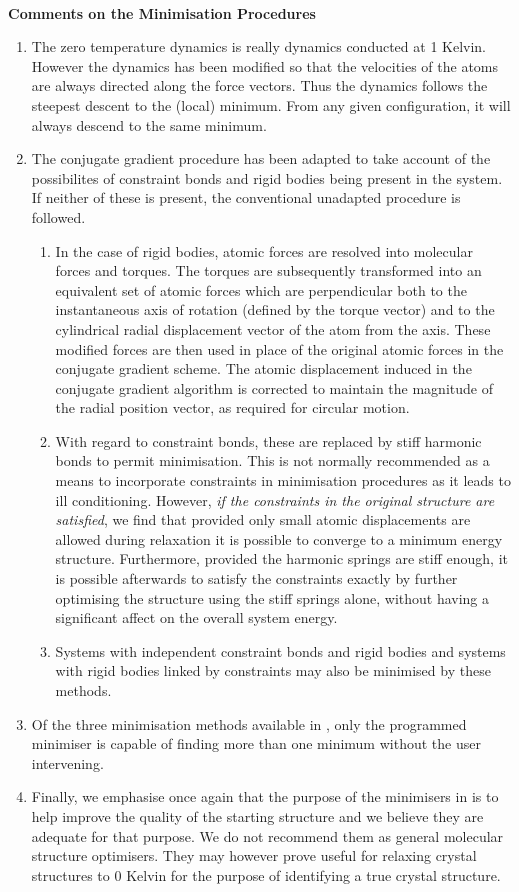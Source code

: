 ~

{\bf Comments on the Minimisation Procedures} 

\begin{enumerate} 
\item The zero temperature dynamics is really dynamics conducted at 1
Kelvin. However the dynamics has been modified so that the velocities
of the atoms are always directed along the force vectors. Thus the
dynamics follows the steepest descent to the (local) minimum. From any
given configuration, it will always descend to the same minimum.
\item The conjugate gradient procedure has been adapted to take
account of the possibilites of constraint bonds and rigid bodies being
present in the system. If neither of these is present, the
conventional unadapted procedure is followed.
\begin{enumerate}
\item In the case of rigid bodies, atomic forces are
resolved into molecular forces and torques. The torques are
subsequently transformed into an equivalent set of atomic forces which
are perpendicular both to the instantaneous axis of rotation (defined
by the torque vector) and to the cylindrical radial displacement
vector of the atom from the axis. These modified forces are then used
in place of the original atomic forces in the conjugate gradient
scheme. The atomic displacement induced in the conjugate gradient
algorithm is corrected to maintain the magnitude of the radial
position vector, as required for circular motion.
\item With regard to constraint bonds, these are replaced by stiff
harmonic bonds to permit minimisation. This is not normally
recommended as a means to incorporate constraints in minimisation
procedures as it leads to ill conditioning. However, {\it if the
constraints in the original structure are satisfied}, we find that
provided only small atomic displacements are allowed during relaxation
it is possible to converge to a minimum energy structure. Furthermore,
provided the harmonic springs are stiff enough, it is possible
afterwards to satisfy the constraints exactly by further optimising
the structure using the stiff springs alone, without having a
significant affect on the overall system energy.
\item Systems with independent constraint bonds and rigid bodies 
and systems with rigid bodies linked by constraints may also be
minimised by these methods.
\end{enumerate}
\item Of the three minimisation methods available in \D{}, only the
programmed minimiser is capable of finding more than one minimum
without the user intervening.
\item Finally, we emphasise once again that the purpose of the
minimisers in \D{} is to help improve the quality of the starting
structure and we believe they are adequate for that purpose. We do not
recommend them as general molecular structure optimisers. They may
however prove useful for relaxing crystal structures to 0 Kelvin for
the purpose of identifying a true crystal structure.
\end{enumerate}






